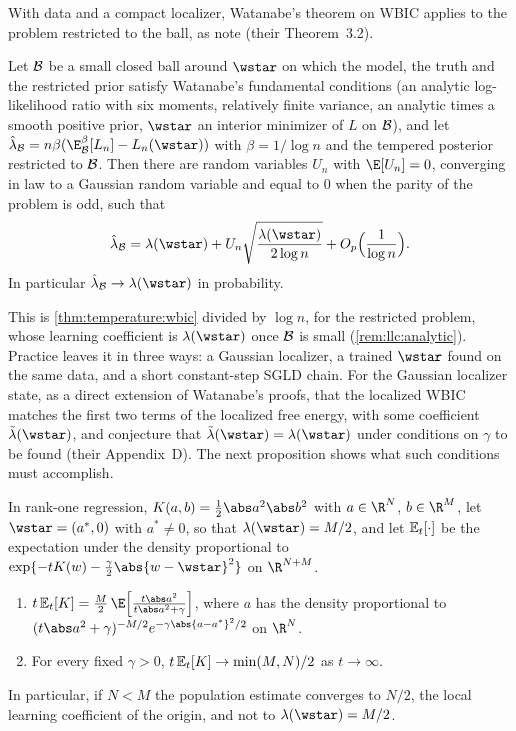 \begin{refsection}
With data and a compact localizer, Watanabe's theorem on WBIC applies to the problem restricted to the ball, as \textcite{HitchcockHoogland2025} note (their Theorem~3.2).

\begin{theorem}\label{thm:llc:wbic}
Let $\mathcal{B}$ be a small closed ball around $\wstar$ on which the model, the truth and the restricted prior satisfy Watanabe's fundamental conditions (an analytic log-likelihood ratio with six moments, relatively finite variance, an analytic times a smooth positive prior, $\wstar$ an interior minimizer of $L$ on $\mathcal{B}$), and let $\hat\lambda_{\llcB}=n\beta(\E^\beta_{\llcB}[L_n]-L_n(\wstar))$ with $\beta=1/\log n$ and the tempered posterior restricted to $\mathcal{B}$. Then there are random variables $U_n$ with $\E[U_n]=0$, converging in law to a Gaussian random variable and equal to $0$ when the parity of the problem is odd, such that
\[
\hat\lambda_{\llcB}=\lambda(\wstar)+U_n\sqrt{\frac{\lambda(\wstar)}{2\log n}}+O_p\Bigl(\frac1{\log n}\Bigr).
\]
In particular $\hat\lambda_{\llcB}\to\lambda(\wstar)$ in probability.
\end{theorem}

This is \cref{thm:temperature:wbic} divided by $\log n$, for the restricted problem, whose learning coefficient is $\lambda(\wstar)$ once $\mathcal{B}$ is small (\cref{rem:llc:analytic}). Practice leaves it in three ways: a Gaussian localizer, a trained $\wstar$ found on the same data, and a short constant-step SGLD chain. For the Gaussian localizer \textcite{LauEtAl2025} state, as a direct extension of Watanabe's proofs, that the localized WBIC matches the first two terms of the localized free energy, with some coefficient $\tilde\lambda(\wstar)$, and conjecture that $\tilde\lambda(\wstar)=\lambda(\wstar)$ under conditions on $\gamma$ to be found (their Appendix~D). The next proposition shows what such conditions must accomplish.

\begin{proposition}\label{prop:llc:gaussian}
In rank-one regression, $K(a,b)=\tfrac12\abs a^2\abs b^2$ with $a\in\R^N$, $b\in\R^M$, let $\wstar=(a^*,0)$ with $a^*\ne0$, so that $\lambda(\wstar)=M/2$, and let $\mathbb{E}_{t}\!\left[\cdot\right]$ be the expectation under the density proportional to $\exp\{-tK(w)-\frac\gamma2\abs{w-\wstar}^2\}$ on $\R^{N+M}$.
\begin{enumerate}
\item $t\,\llcpop{K}=\frac M2\,\E\Bigl[\frac{t\abs a^2}{t\abs a^2+\gamma}\Bigr]$, where $a$ has the density proportional to $(t\abs a^2+\gamma)^{-M/2}e^{-\gamma\abs{a-a^*}^2/2}$ on $\R^N$.
\item For every fixed $\gamma>0$, $t\,\mathbb{E}_{t}\!\left[K\right]\to\min(M,N)/2$ as $t\to\infty$.
\end{enumerate}
In particular, if $N<M$ the population estimate converges to $N/2$, the local learning coefficient of the origin, and not to $\lambda(\wstar)=M/2$.
\end{proposition}


\end{refsection}
